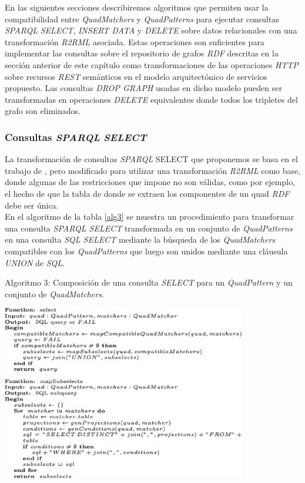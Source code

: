 En las siguientes secciones describiremos algoritmos que permiten usar la compatibilidad entre \textit{QuadMatchers} y \textit{QuadPatterns} para ejecutar consultas \textit{SPARQL} \textit{SELECT}, \textit{INSERT DATA} y \textit{DELETE} sobre datos relacionales con una transformaci\'on \textit{R2RML} asociada. Estas operaciones son suficientes para implementar las consultas sobre el repositorio de grafos \textit{RDF} descritas en la secci\'on anterior de este cap\'itulo como transformaciones de las operaciones \textit{HTTP} sobre recursos \textit{REST} sem\'anticos en el modelo arquitect\'onico de servicios propuesto. Las consultas \textit{DROP GRAPH} usadas en dicho modelo pueden ser transformadas en operaciones \textit{DELETE} equivalentes donde todos los tripletes del grafo son eliminados.

\subsubsection{Consultas \textit{SPARQL} \textit{SELECT}}

La transformaci\'on de consultas \textit{SPARQL} SELECT que proponemos se basa en el trabajo de \cite{chebotko2009semantics}, pero modificado para utilizar una transformaci\'on \textit{R2RML} como base, donde algunas de las restricciones que impone no son v\'alidas, como por ejemplo, el hecho de que la tabla de donde se extraen los componentes de un quad \textit{RDF} debe ser \'unica.\\
En el algoritmo de la tabla \ref{alg3} se muestra un procedimiento para transformar una consulta \textit{SPARQL SELECT} transformada en un conjunto de \textit{QuadPatterns} en una consulta \textit{SQL SELECT} mediante la b\'usqueda de los \textit{QuadMatchers} compatibles con los \textit{QuadPatterns} que luego son unidos mediante una cl\'ausula \textit{UNION} de \textit{SQL}.

\begin{table}
\vspace{2.4in}
\caption{Algoritmo 3: Composici\'on de una consulta \textit{SELECT} para un \textit{QuadPattern} y un conjunto de \textit{QuadMatchers}.}
\includegraphics[width=0.8\textwidth]{algoritmo3}
\label{alg3}
\end{table}


